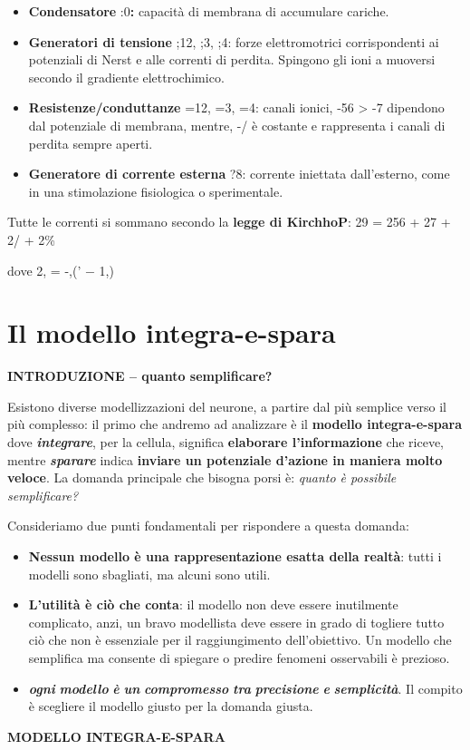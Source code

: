 \documentclass[12pt,a4paper,openany]{book}
\begin{document}
\begin{itemize}
  \item \textbf{Condensatore }:0\textbf{: }capacità di membrana di accumulare cariche.
  \item \textbf{Generatori di tensione };12, ;3, ;4: forze elettromotrici corrispondenti ai potenziali di Nerst e alle correnti di perdita. Spingono gli ioni a muoversi secondo il gradiente elettrochimico.
  \item \textbf{Resistenze/conduttanze }=12, =3, =4: canali ionici, -56 > -7 dipendono dal potenziale di membrana, mentre, -/ è costante e rappresenta i canali di perdita sempre aperti.
  \item \textbf{Generatore di corrente esterna }?8: corrente iniettata dall'esterno, come in una stimolazione fisiologica o sperimentale.
\end{itemize}
Tutte le correnti si sommano secondo la \textbf{legge di KirchhoP}: 29 = 256 + 27 + 2/ + 2\%

dove 2, = -,(' $-$ 1,)

\section{Il modello integra-e-spara}

\textbf{INTRODUZIONE -- quanto semplificare?}

Esistono diverse modellizzazioni del neurone, a partire dal più semplice verso il più complesso: il primo che andremo ad analizzare è il \textbf{modello integra-e-spara }dove \textbf{\textit{integrare}}, per la cellula, significa \textbf{elaborare l'informazione }che riceve, mentre \textbf{\textit{sparare}}\textbf{\textit{ }}indica \textbf{inviare un potenziale d'azione in maniera molto veloce}.
La domanda principale che bisogna porsi è:
\textit{quanto è possibile semplificare?}

Consideriamo due punti fondamentali per rispondere a questa domanda:

\begin{itemize}
  \item \textbf{Nessun modello è una rappresentazione esatta della realtà}: tutti i modelli sono sbagliati, ma alcuni sono utili.
  \item \textbf{L'utilità è ciò che conta}: il modello non deve essere inutilmente complicato, anzi, un bravo modellista deve essere in grado di togliere tutto ciò che non è essenziale per il raggiungimento dell'obiettivo. Un modello che semplifica ma consente di spiegare o predire fenomeni osservabili è prezioso.
  \item \textbf{\textit{ogni}}\textbf{\textit{ }}\textbf{\textit{modello}}\textbf{\textit{ }}\textbf{\textit{è}}\textbf{\textit{ }}\textbf{\textit{un}}\textbf{\textit{ }}\textbf{\textit{compromesso}}\textbf{\textit{ }}\textbf{\textit{tra}}\textbf{\textit{ }}\textbf{\textit{precisione}}\textbf{\textit{ }}\textbf{\textit{e}}\textbf{\textit{ }}\textbf{\textit{semplicità}}. Il compito è scegliere il modello giusto per la domanda giusta.
\end{itemize}
\textbf{MODELLO  INTEGRA-E-SPARA}
\end{document}
